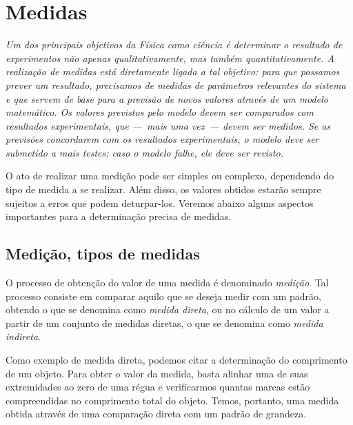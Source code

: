 \chapter{Medidas}
\label{Chap:Medidas}

\begin{fullwidth}
{\it Um dos principais objetivos da Física como ciência é determinar o resultado de experimentos não apenas qualitativamente, mas também quantitativamente. A realização de medidas está diretamente ligada a tal objetivo: para que possamos prever um resultado, precisamos de medidas de parâmetros relevantes do sistema e que servem de base para a previsão de novos valores através de um modelo matemático. Os valores previstos pelo modelo devem ser comparados com resultados experimentais, que ---~mais uma vez~--- devem ser medidos. Se as previsões concordarem com os resultados experimentais, o modelo deve ser submetido a mais testes; caso o modelo falhe, ele deve ser revisto. 

 O ato de realizar uma medição pode ser simples ou complexo, dependendo do tipo de medida a se realizar. Além disso, os valores obtidos estarão sempre sujeitos a erros que podem deturpar-los. Veremos abaixo alguns aspectos importantes para a determinação precisa de medidas.}
\end{fullwidth}

\section{Medição, tipos de medidas}

O processo de obtenção do valor de uma medida é denominado \emph{medição}. Tal processo consiste em comparar aquilo que se deseja medir com um padrão, obtendo o que se denomina como \emph{medida direta}, ou no cálculo de um valor a partir de um conjunto de medidas diretas, o que se denomina como \emph{medida indireta}.

Como exemplo de medida direta, podemos citar a determinação do comprimento de um objeto. Para obter o valor da medida, basta alinhar uma de suas extremidades ao zero de uma régua e verificarmos quantas marcas estão compreendidas no comprimento total do objeto. Temos, portanto, uma medida obtida através de uma comparação direta com um padrão de grandeza.

